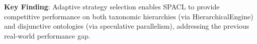 \textbf{Key Finding}: Adaptive strategy selection enables SPACL to provide 
competitive performance on both taxonomic hierarchies (via HierarchicalEngine) 
and disjunctive ontologies (via speculative parallelism), addressing the 
previous real-world performance gap.



